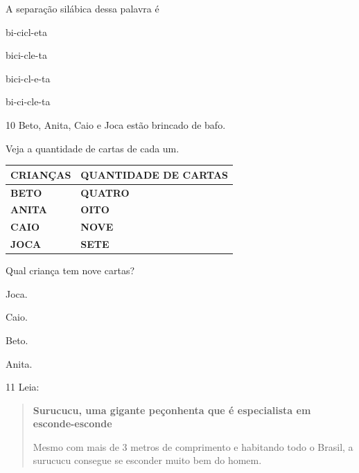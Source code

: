 
A separação silábica dessa palavra é

\begin{escolha}
\item bi-cicl-eta

\item bici-cle-ta

\item bici-cl-e-ta

\item bi-ci-cle-ta
\end{escolha}

\num{10} Beto, Anita, Caio e Joca estão brincado de bafo.

Veja a quantidade de cartas de cada um.

\begin{longtable}[]{@{}ll@{}}
\toprule
\textbf{CRIANÇAS} & \textbf{QUANTIDADE DE CARTAS}\tabularnewline
\midrule
\endhead
\textbf{BETO} & \textbf{QUATRO}\tabularnewline
\textbf{ANITA} & \textbf{OITO}\tabularnewline
\textbf{CAIO} & \textbf{NOVE}\tabularnewline
\textbf{JOCA} & \textbf{SETE}\tabularnewline
\bottomrule
\end{longtable}

Qual criança tem nove cartas?

\begin{escolha}
\item Joca.

\item Caio.

\item Beto.

\item Anita.
\end{escolha}

\num{11} Leia:

\begin{quote}
\textbf{Surucucu, uma gigante peçonhenta que é especialista em esconde-esconde}

Mesmo com mais de 3 metros de comprimento e habitando todo o Brasil, a
surucucu consegue se esconder muito bem do homem.

\end{quote}

